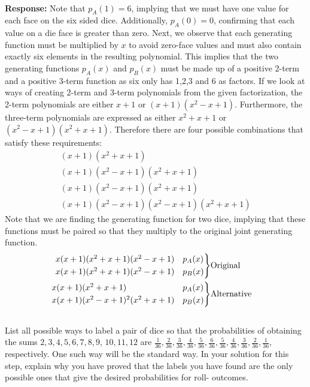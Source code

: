 \documentclass{article}
\newcommand{\response}[1]{\leavevmode\\[0.05in]{\bf Response: } #1 \leavevmode\\[0.05in]}
\begin{document}
\response{Note that $p_A(1) = 6$, implying that we must have one value for each face on the six sided dice.  Additionally, $p_A(0) = 0$, confirming that each value on a die face is greater than zero. Next, we observe that each generating function must be multiplied by $x$ to avoid zero-face values and must also contain exactly six elements in the resulting polynomial. This implies that the two generating functions $p_A(x)$ and $p_B(x)$ must be made up of a positive 2-term and a positive 3-term function as six only has 1,2,3 and 6 as factors.  If we look at ways of creating 2-term and 3-term polynomials from the given factorization, the 2-term polynomials are either $x + 1$ or $(x + 1)(x^2 - x + 1)$.  Furthermore, the three-term polynomials are expressed as either $x^2 + x + 1$ or $(x^2 - x + 1)(x^2 + x + 1)$. Therefore there are four possible combinations that satisfy these requirements: 
\begin{equation*}\begin{aligned}
	(x + 1)(x^2 + x + 1)  \\
	(x + 1)(x^2 - x + 1)(x^2 + x + 1) \\
	(x + 1)(x^2 - x + 1)(x^2 + x + 1) \\
	(x + 1)(x^2 - x + 1)(x^2 - x + 1)(x^2 + x + 1)
\end{aligned}\end{equation*}
Note that we are finding the generating function for two dice, implying that these functions must be paired so that they multiply to the original joint generating function. 
\begin{equation*}\begin{aligned}
	\begin{rcases}
		x(x + 1)(x^2 + x + 1)(x^2 - x + 1) & p_A(x)\\
		x(x + 1)(x^2 + x + 1)(x^2 - x + 1) & p_B(x) \\ 
	\end{rcases} & \text{Original} \\ 
	\begin{rcases}
		x(x + 1)(x^2 + x + 1) & p_A(x)\\
		x(x + 1)(x^2 - x + 1)^2(x^2 + x + 1) & p_B(x) \\
	\end{rcases} & \text{Alternative} \\
\end{aligned}\end{equation*}}
 List all possible ways to label a pair of dice so that the probabilities of obtaining the sums $2, 3, 4, 5, 6, 7, 8, 9$, $10, 11, 12$ are $\frac{1}{36}, \frac{2}{36}, \frac{3}{36}, \frac{4}{36}, \frac{5}{36}, \frac{6}{36}, \frac{5}{36}, \frac{4}{36}, \frac{3}{36}, \frac{2} {36},\frac{1}{36}$, respectively.  One such way will be the standard way.  In your solution for this step, explain why you have proved that the labels you have found are the only possible ones that give the desired probabilities for roll- outcomes.
\end{document}
